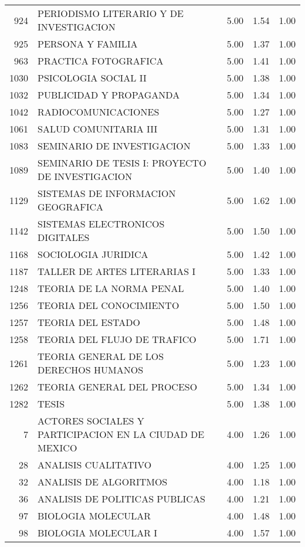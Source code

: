 \documentclass[12pt]{article}
\begin{document}
\begin{table}[ht]
\begin{tabular}{rlrrr}
  924 & PERIODISMO LITERARIO Y DE INVESTIGACION & 5.00 & 1.54 & 1.00 \\ 
  925 & PERSONA Y FAMILIA & 5.00 & 1.37 & 1.00 \\ 
  963 & PRACTICA FOTOGRAFICA & 5.00 & 1.41 & 1.00 \\ 
  1030 & PSICOLOGIA SOCIAL II & 5.00 & 1.38 & 1.00 \\ 
  1032 & PUBLICIDAD Y PROPAGANDA & 5.00 & 1.34 & 1.00 \\ 
  1042 & RADIOCOMUNICACIONES & 5.00 & 1.27 & 1.00 \\ 
  1061 & SALUD COMUNITARIA III & 5.00 & 1.31 & 1.00 \\ 
  1083 & SEMINARIO DE INVESTIGACION & 5.00 & 1.33 & 1.00 \\ 
  1089 & SEMINARIO DE TESIS I: PROYECTO DE INVESTIGACION & 5.00 & 1.40 & 1.00 \\ 
  1129 & SISTEMAS DE INFORMACION GEOGRAFICA & 5.00 & 1.62 & 1.00 \\ 
  1142 & SISTEMAS ELECTRONICOS DIGITALES & 5.00 & 1.50 & 1.00 \\ 
  1168 & SOCIOLOGIA JURIDICA & 5.00 & 1.42 & 1.00 \\ 
  1187 & TALLER DE ARTES LITERARIAS I & 5.00 & 1.33 & 1.00 \\ 
  1248 & TEORIA DE LA NORMA PENAL & 5.00 & 1.40 & 1.00 \\ 
  1256 & TEORIA DEL CONOCIMIENTO & 5.00 & 1.50 & 1.00 \\ 
  1257 & TEORIA DEL ESTADO & 5.00 & 1.48 & 1.00 \\ 
  1258 & TEORIA DEL FLUJO DE TRAFICO & 5.00 & 1.71 & 1.00 \\ 
  1261 & TEORIA GENERAL DE LOS DERECHOS HUMANOS & 5.00 & 1.23 & 1.00 \\ 
  1262 & TEORIA GENERAL DEL PROCESO & 5.00 & 1.34 & 1.00 \\ 
  1282 & TESIS & 5.00 & 1.38 & 1.00 \\ 
  7 & ACTORES SOCIALES Y PARTICIPACION EN LA CIUDAD DE MEXICO & 4.00 & 1.26 & 1.00 \\ 
  28 & ANALISIS CUALITATIVO & 4.00 & 1.25 & 1.00 \\ 
  32 & ANALISIS DE ALGORITMOS & 4.00 & 1.18 & 1.00 \\ 
  36 & ANALISIS DE POLITICAS PUBLICAS & 4.00 & 1.21 & 1.00 \\ 
  97 & BIOLOGIA MOLECULAR & 4.00 & 1.48 & 1.00 \\ 
  98 & BIOLOGIA MOLECULAR I & 4.00 & 1.57 & 1.00 \\ 

\end{tabular}
\end{table}
\end{document}
